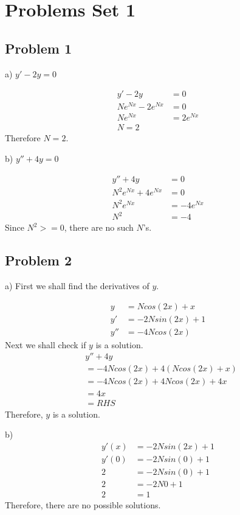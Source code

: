 \documentclass{article}
\begin{document}
\noindent
\section{Problems Set 1}
\subsection{Problem 1}
a) $y' - 2y = 0$

\begin{align*}
  y' - 2y &= 0
  \\ Ne^{Nx} - 2e^{Nx} &= 0
  \\ Ne^{Nx} &= 2e^{Nx}
  \\ N = 2
\end{align*}
Therefore $N = 2$.

\vspace{1em}
\noindent
b) $y'' + 4y = 0$

\begin{align*}
  y'' + 4y &= 0
  \\ N^2e^{Nx} + 4e^{Nx} &= 0
  \\ N^2e^{Nx} &= -4e^{Nx}
  \\ N^2 &= -4
\end{align*}
Since $N^2 >= 0$, there are no such $N$'s.

\subsection{Problem 2}

a) First we shall find the derivatives of $y$.

\begin{align*}
  y &= Ncos(2x) + x
  \\ y' &= -2Nsin(2x) + 1
  \\ y'' &= -4Ncos(2x)
\end{align*}
Next we shall check if $y$ is a solution.
\begin{align*}
  &y'' + 4y
  \\ &= -4Ncos(2x) + 4(Ncos(2x) + x)
  \\ &= -4Ncos(2x) + 4Ncos(2x) + 4x
  \\ &= 4x
  \\ &= RHS
\end{align*}
Therefore, $y$ is a solution.

\vspace{1em}
\noindent
b)
\begin{align*}
  y'(x) &= -2Nsin(2x) + 1
  \\ y'(0) &= -2Nsin(0) + 1
  \\ 2 &= -2Nsin(0) + 1
  \\ 2 &= -2N0 + 1
  \\ 2 &= 1
\end{align*}
Therefore, there are no possible solutions.
\end{document}
